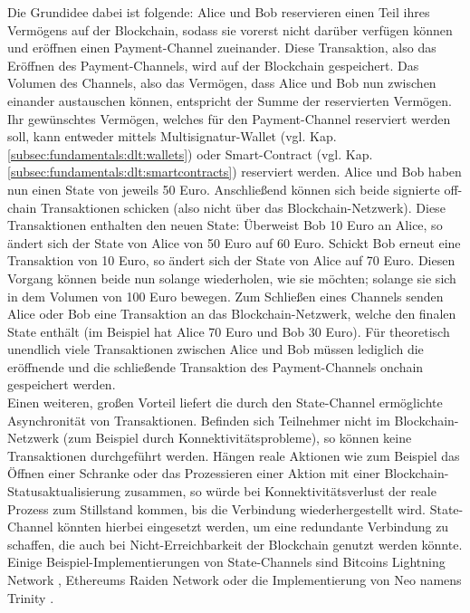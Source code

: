 Die Grundidee dabei ist folgende: Alice und Bob reservieren einen Teil ihres Vermögens auf der Blockchain, sodass sie vorerst nicht darüber verfügen können und eröffnen einen Payment-Channel zueinander. Diese Transaktion, also das Eröffnen des Payment-Channels, wird auf der Blockchain gespeichert. Das Volumen des Channels, also das Vermögen, dass Alice und Bob nun zwischen einander austauschen können, entspricht der Summe der reservierten Vermögen. Ihr gewünschtes Vermögen, welches für den Payment-Channel reserviert werden soll, kann entweder mittels Multisignatur-Wallet (vgl. Kap. \ref{subsec:fundamentals:dlt:wallets}) oder Smart-Contract (vgl. Kap. \ref{subsec:fundamentals:dlt:smartcontracts}) reserviert werden. Alice und Bob haben nun einen State von jeweils 50 Euro. Anschließend können sich beide signierte off-chain Transaktionen schicken (also nicht über das Blockchain-Netzwerk). Diese Transaktionen enthalten den neuen State: Überweist Bob 10 Euro an Alice, so ändert sich der State von Alice von 50 Euro auf 60 Euro. Schickt Bob erneut eine Transaktion von 10 Euro, so ändert sich der State von Alice auf 70 Euro. Diesen Vorgang können beide nun solange wiederholen, wie sie möchten; solange sie sich in dem Volumen von 100 Euro bewegen. Zum Schließen eines Channels senden Alice oder Bob eine Transaktion an das Blockchain-Netzwerk, welche den finalen State enthält (im Beispiel hat Alice 70 Euro und Bob 30 Euro). Für theoretisch unendlich viele Transaktionen zwischen Alice und Bob müssen lediglich die eröffnende und die schließende Transaktion des Payment-Channels onchain gespeichert werden.\\
Einen weiteren, großen Vorteil liefert die durch den State-Channel ermöglichte Asynchronität von Transaktionen. Befinden sich Teilnehmer nicht im Blockchain-Netzwerk (zum Beispiel durch Konnektivitätsprobleme), so können keine Transaktionen durchgeführt werden. Hängen reale Aktionen wie zum Beispiel das Öffnen einer Schranke oder das Prozessieren einer Aktion mit einer Blockchain-Statusaktualisierung zusammen, so würde bei Konnektivitätsverlust der reale Prozess zum Stillstand kommen, bis die Verbindung wiederhergestellt wird. State-Channel könnten hierbei eingesetzt werden, um eine redundante Verbindung zu schaffen, die auch bei Nicht-Erreichbarkeit der Blockchain genutzt werden könnte. Einige Beispiel-Implementierungen von State-Channels sind Bitcoins Lightning Network \cite{Lightning2016}, Ethereums Raiden Network oder die Implementierung von Neo namens Trinity \cite{Trinity2018}.\\
